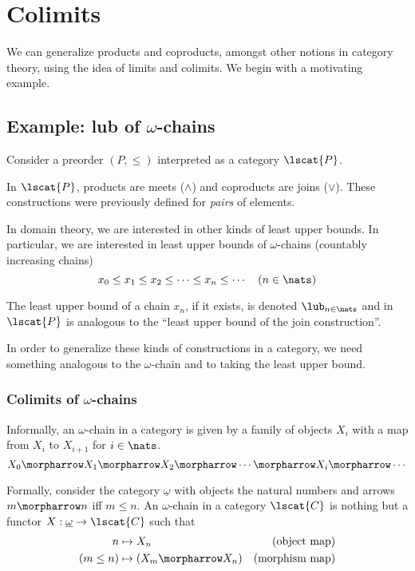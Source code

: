 \newcommand*{\threesim}{%
\mathrel{\vcenter{\offinterlineskip
\hbox{$\sim$}\vskip-.45ex\hbox{$\sim$}\vskip-.45ex\hbox{$\sim$}}}}

\chapter{Colimits}

We can generalize products and coproducts, amongst other notions in category
theory, using the idea of limits and colimits. We begin with a motivating
example.

\section{Example: lub of $\omega$-chains}

Consider a preorder $(P, \leq)$ interpreted as a category  $\lscat{P}$.

In $\lscat{P}$,  products are meets ($\wedge$) and coproducts are joins
($\vee$). These constructions were previously defined for \emph{pairs} of
elements.

In domain theory, we are interested in other kinds of least upper bounds. In
particular, we are interested in least upper bounds of $\omega$-chains
(countably increasing chains)
\[
	x_0 \leq x_1 \leq x_2 \leq \cdots \leq x_n \leq \cdots \quad (n \in \nats)
\]

The least upper bound of a chain $x_n$, if it exists, is denoted $\lub_{n \in
    \nats}$ and in $\lscat{P}$ is analogous to the ``least upper bound of the
join construction''.

In order to generalize these kinds of constructions in a category, we need
something analogous to the $\omega$-chain and to taking the least upper bound.

\subsection{Colimits of $\omega$-chains}

\begin{definition}
Informally, an $\omega$-chain in a category is given by a family of objects
$X_i$ with a map from $X_i$ to $X_{i+1}$ for $i \in \nats$.
\[
    X_0 \morpharrow X_1 \morpharrow X_2 \morpharrow \cdots \morpharrow X_i
    \morpharrow \cdots
\]

Formally, consider the category $\underline{\omega}$ with objects the natural
numbers and arrows $m \morpharrow n$ iff $m \leq n$. An $\omega$-chain in a
category $\lscat{C}$ is nothing but a functor $X : \underline{\omega} \to
\lscat{C}$ such that
\begin{align*}
	n & \mapsto X_n & (\text{object map}) \\
	(m \leq n) & \mapsto (X_m \morpharrow X_n) &(\text{morphism map})
\end{align*}

\end{definition}

